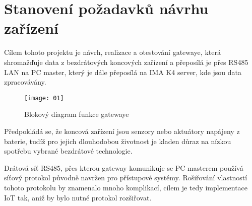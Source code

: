 \chapter{Stanovení požadavků návrhu zařízení}

Cílem tohoto projektu je návrh, realizace a otestování gatewaye, která shromažďuje data z bezdrátových koncových zařízení a přeposílá je přes RS485 LAN na PC master, který je dále přeposílá na IMA K4 server, kde jsou data zpracovávány.

\begin{figure}[!h]
    \centering
    \texttt{[image: 01]}
    \caption{Blokový diagram funkce gatewaye}
    \label{fig:block diagram of the system}
\end{figure}

Předpokládá se, že koncová zařízení jsou senzory nebo aktuátory napájeny z baterie, tudíž pro jejich dlouhodobou životnost je kladen důraz na nízkou spotřebu vybrané bezdrátové technologie.

Drátová síť RS485, přes kterou gateway komunikuje se PC masterem používá síťový protokol původně navržen pro přístupové systémy. 
Rošiřování vlastností tohoto protokolu by znamenalo mnoho komplikací, cílem je tedy implementace IoT tak, aniž by bylo nutné protokol rozšiřovat.


